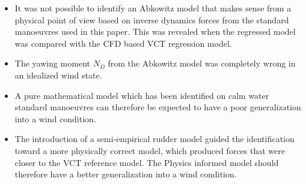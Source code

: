 \begin{itemize}
    \item It was not possible to identify an Abkowitz model that makes sense from a physical point of view based on inverse dynamics forces from the standard manoeuvres used in this paper. This was revealed when the regressed model was compared with the CFD based VCT regression model.
    \item The yawing moment $N_D$ from the Abkowitz model was completely wrong in an idealized wind state.
    \item A pure mathematical model which has been identified on calm water standard manoeuvres can therefore be expected to have a poor generalization into a wind condition.   
    \item The introduction of a semi-empirical rudder model guided the identification toward a more physically correct model, which produced forces that were closer to the VCT reference model. The Physics informed model should therefore have a better generalization into a wind condition.
\end{itemize}